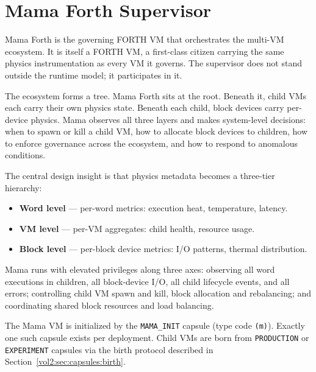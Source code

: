 \section{Mama Forth Supervisor}
\label{vol2:sec:capsules:mama}


Mama Forth is the governing FORTH VM that orchestrates the multi-VM
ecosystem. It is itself a FORTH VM, a first-class citizen carrying the same
physics instrumentation as every VM it governs. The supervisor does not
stand outside the runtime model; it participates in it.

The ecosystem forms a tree. Mama Forth sits at the root. Beneath it, child
VMs each carry their own physics state. Beneath each child, block devices
carry per-device physics. Mama observes all three layers and makes
system-level decisions: when to spawn or kill a child VM, how to allocate
block devices to children, how to enforce governance across the ecosystem,
and how to respond to anomalous conditions.

The central design insight is that physics metadata becomes a three-tier
hierarchy:

\begin{itemize}
  \item \textbf{Word level} --- per-word metrics: execution heat, temperature,
        latency.
  \item \textbf{VM level} --- per-VM aggregates: child health, resource usage.
  \item \textbf{Block level} --- per-block device metrics: I/O patterns,
        thermal distribution.
\end{itemize}

Mama runs with elevated privileges along three axes: observing all word
executions in children, all block-device I/O, all child lifecycle events,
and all errors; controlling child VM spawn and kill, block allocation and
rebalancing; and coordinating shared block resources and load balancing.


The Mama VM is initialized by the \texttt{MAMA\_INIT} capsule (type code
\texttt{(m)}). Exactly one such capsule exists per deployment. Child VMs
are born from \texttt{PRODUCTION} or \texttt{EXPERIMENT} capsules via
the birth protocol described in Section~\ref{vol2:sec:capsules:birth}.
